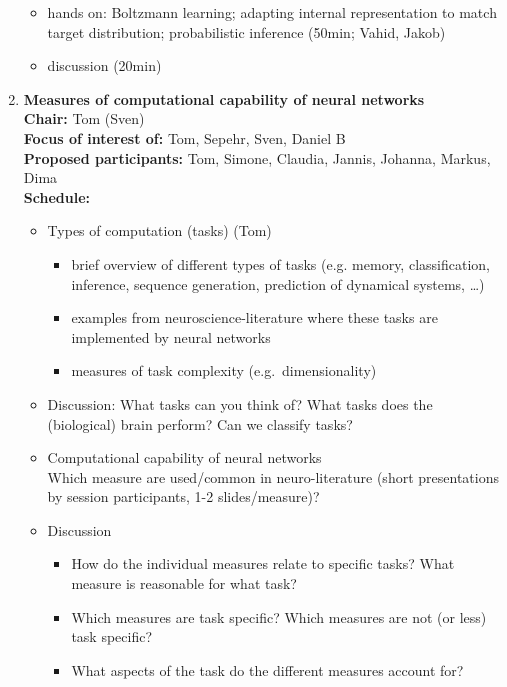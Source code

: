 \documentclass[10pt, a4paper,twoside,american]{article}
\begin{document}
\begin{enumerate}[resume]
\begin{itemize}
  \item hands on: Boltzmann learning; adapting internal representation to match target distribution; probabilistic inference (50min; Vahid, Jakob)
  \item discussion (20min)
  \end{itemize}
\item {\large\bf Measures of computational capability of neural networks}\\[1ex]
  {\bf Chair:} Tom (Sven)\\[1ex]
  {\bf Focus of interest of:} Tom, Sepehr, Sven, Daniel B\\[1ex]
  {\bf Proposed participants:} Tom, Simone, Claudia, Jannis, Johanna, Markus, Dima\\[1ex]
  {\bf Schedule:}
  \begin{itemize}
  \item Types of computation (tasks) (Tom)
    \begin{itemize}
    \item brief overview of different types of tasks
      (e.g. memory, classification, inference, sequence generation, prediction of dynamical systems, \ldots)
    \item examples from neuroscience-literature where these tasks are implemented by neural networks
    \item measures of task complexity (e.g.~dimensionality)
    \end{itemize}
  \item Discussion:
    What tasks can you think of? What tasks does the (biological) brain perform?
    Can we classify tasks?
  \item Computational capability of neural networks\\[1ex]
    Which measure are used/common in neuro-literature (short presentations by session participants, 1-2 slides/measure)?
  \item Discussion
    \begin{itemize}
    \item How do the individual measures relate to specific tasks? What measure is reasonable for what task?
    \item Which measures are task specific? Which measures are not (or less) task specific?
    \item What aspects of the task do the different measures account for? 
    \end{itemize}
  \end{itemize}

\end{enumerate}
\end{document}
